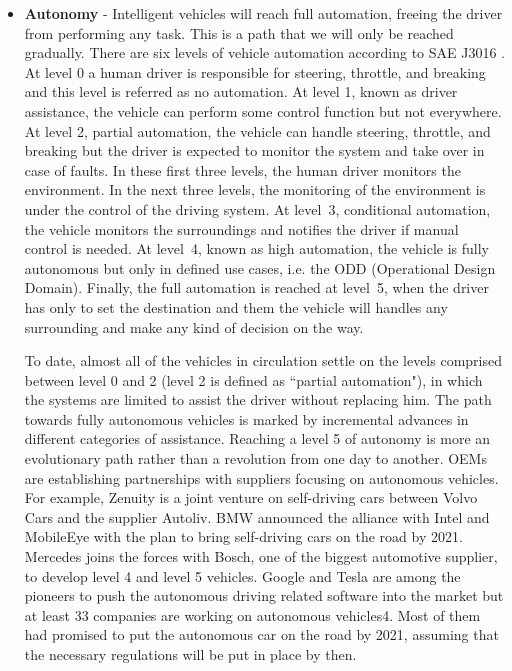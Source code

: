 \begin{itemize}
\item {\bf Autonomy} -
Intelligent vehicles will reach full automation, freeing the driver from performing
any task. This is a path that we will only be reached gradually. There are six levels
of vehicle automation according to SAE J3016 \cite{sae2018taxonomy}. At level 0 a human driver is responsible for steering, throttle, and breaking and this level is referred as no automation. 
At level 1, known as driver assistance, the vehicle can perform some control function but not everywhere. At level 2, partial automation, the vehicle can handle steering, throttle, and breaking but the driver
is expected to monitor the system and take over in case of faults. In these first three levels, the human driver
monitors the environment. In the next three levels, the monitoring of the environment is under the control of the driving system. At level~3, conditional automation, the vehicle monitors the surroundings and notifies the driver if manual control is needed. At level~4, known as high automation, the vehicle is fully autonomous but only in defined use cases, i.e. the ODD (Operational Design Domain). Finally, the full automation is reached at level~5, when the driver has only to set the destination and them the vehicle will handles any surrounding and make any kind of decision on the way.

To date, almost all of the
vehicles in circulation settle on the levels comprised between level 0 and 2 (level
2 is defined as ``partial automation"), in which the systems are limited to assist the
driver without replacing him.
The path towards fully autonomous vehicles
is marked by incremental advances in different categories of assistance. Reaching a
level 5 of autonomy is more an evolutionary path rather than a revolution from one
day to another.
OEMs are establishing
partnerships with suppliers focusing on autonomous vehicles. For example,
Zenuity is a joint venture on self-driving cars between Volvo Cars and the supplier
Autoliv. BMW announced the alliance with Intel and MobileEye with the plan to
bring self-driving cars on the road by 2021. Mercedes joins the forces with Bosch,
one of the biggest automotive supplier, to develop level 4 and level 5 vehicles.
Google and Tesla are among the pioneers to push the autonomous driving related
software into the market but at least 33 companies are working on autonomous
vehicles4. Most of them had promised to put the autonomous car on the road by
2021, assuming that the necessary regulations will be put in place by then.



\end{itemize}
